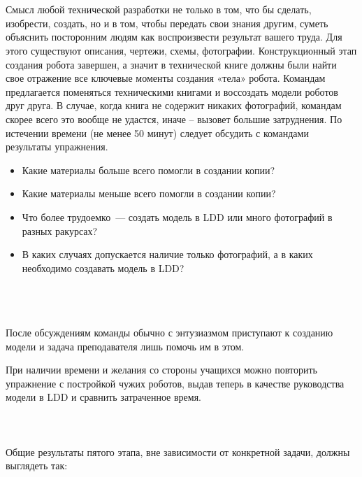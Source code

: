 {\hypertarget{lesson27x2}{}}\\\\

Смысл любой технической разработки не только в том, что бы сделать, изобрести, создать, но и в том, чтобы передать свои знания другим, суметь объяснить посторонним людям как воспроизвести результат вашего труда. Для этого существуют описания, чертежи, схемы, фотографии. 
Конструкционный этап создания робота завершен, а значит в технической книге должны были найти свое отражение все ключевые моменты создания «тела» робота. Командам предлагается поменяться техническими книгами и воссоздать модели роботов друг друга.
В случае, когда книга не содержит никаких фотографий,  командам скорее всего это вообще не удастся, иначе – вызовет большие затруднения. По истечении времени (не менее 50 минут) следует обсудить с командами результаты упражнения.

\begin{itemize}
	\item Какие материалы больше всего помогли в создании копии?
	\item Какие материалы меньше всего помогли в создании копии?
	\item Что более трудоемко~--- создать модель в LDD или много фотографий в разных ракурсах?
	\item В каких случаях допускается наличие только фотографий, а в каких необходимо создавать модель в LDD?\\\\
\end{itemize}

{\hypertarget{lesson27x3}{}}\\\\

После обсуждениям команды обычно с энтузиазмом приступают к созданию модели и задача преподавателя лишь помочь им в этом.

При наличии времени и желания со стороны учащихся можно повторить упражнение с постройкой чужих роботов, выдав теперь в качестве руководства модели в LDD и сравнить затраченное время.\\\\
\clearpage
{\hypertarget{lesson27x3}{}}\\\\

Общие результаты пятого этапа, вне зависимости от конкретной задачи, должны выглядеть так:

